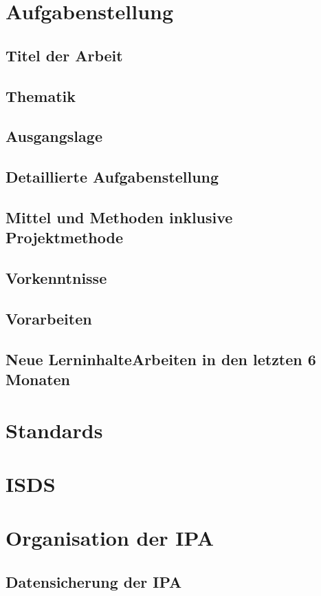 \documentclass{report}
\begin{document}
\chapter{Aufgabenstellung}
\section{Titel der Arbeit}
\section{Thematik}
\section{Ausgangslage}
\section{Detaillierte Aufgabenstellung}
\section{Mittel und Methoden inklusive Projektmethode}
\section{Vorkenntnisse}
\section{Vorarbeiten}
\section{Neue LerninhalteArbeiten in den letzten 6 Monaten}


\chapter{Standards}

\chapter{ISDS}

\chapter{Organisation der IPA}
\section{Datensicherung der IPA}
\end{document}
